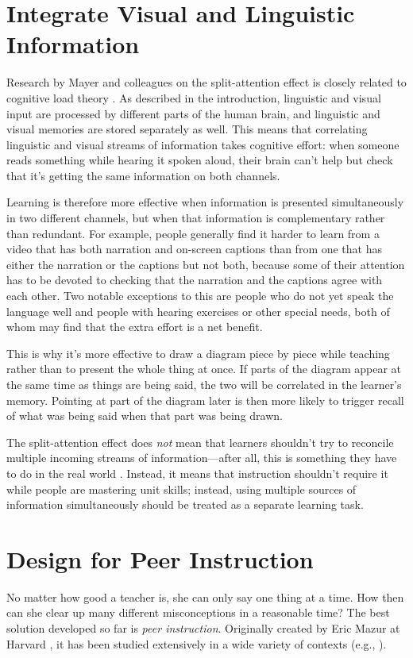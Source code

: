 \documentclass[10pt,letterpaper]{article}
\newcommand{\rulemajor}[1]{\section{#1}}
\begin{document}
\rulemajor{Integrate Visual and Linguistic Information}

Research by Mayer and colleagues on the split-attention effect is closely
related to cognitive load theory \cite{Maye2003}.  As described in the
introduction, linguistic and visual input are processed by different parts of
the human brain, and linguistic and visual memories are stored separately as
well. This means that correlating linguistic and visual streams of information
takes cognitive effort: when someone reads something while hearing it spoken
aloud, their brain can't help but check that it's getting the same information
on both channels.

Learning is therefore more effective when information is presented
simultaneously in two different channels, but when that information is
complementary rather than redundant. For example, people generally find it
harder to learn from a video that has both narration and on-screen captions than
from one that has either the narration or the captions but not both, because
some of their attention has to be devoted to checking that the narration and the
captions agree with each other. Two notable exceptions to this are people who do
not yet speak the language well and people with hearing exercises or other
special needs, both of whom may find that the extra effort is a net benefit.

This is why it's more effective to draw a diagram piece by piece while teaching
rather than to present the whole thing at once. If parts of the diagram appear
at the same time as things are being said, the two will be correlated in the
learner's memory. Pointing at part of the diagram later is then more likely to
trigger recall of what was being said when that part was being drawn.

The split-attention effect does \emph{not} mean that learners shouldn't try to
reconcile multiple incoming streams of information---after all, this is
something they have to do in the real world \cite{Atki2000}. Instead, it means
that instruction shouldn't require it while people are mastering unit skills;
instead, using multiple sources of information simultaneously should be treated
as a separate learning task.
  
\rulemajor{Design for Peer Instruction}

No matter how good a teacher is, she can only say one thing at a time.  How then
can she clear up many different misconceptions in a reasonable time? The best
solution developed so far is \emph{peer instruction}. Originally created by Eric
Mazur at Harvard \cite{Crou2001}, it has been studied extensively in a wide
variety of contexts (e.g., \cite{Vick2015,Port2016}).
\end{document}
